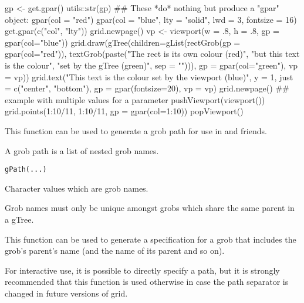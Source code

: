 \begin{Examples}
\begin{ExampleCode}
gp <- get.gpar()
utils::str(gp)
## These *do* nothing but produce a "gpar" object:
gpar(col = "red")
gpar(col = "blue", lty = "solid", lwd = 3, fontsize = 16)
get.gpar(c("col", "lty"))
grid.newpage()
vp <- viewport(w = .8, h = .8, gp = gpar(col="blue"))
grid.draw(gTree(children=gList(rectGrob(gp = gpar(col="red")),
                     textGrob(paste("The rect is its own colour (red)",
                                    "but this text is the colour",
                                    "set by the gTree (green)",
                                    sep = "\n"))),
      gp = gpar(col="green"), vp = vp))
grid.text("This text is the colour set by the viewport (blue)",
          y = 1, just = c("center", "bottom"),
          gp = gpar(fontsize=20), vp = vp)
grid.newpage()
## example with multiple values for a parameter
pushViewport(viewport())
grid.points(1:10/11, 1:10/11, gp = gpar(col=1:10))
popViewport()
\end{ExampleCode}
\end{Examples}
%
\begin{Description}\relax
This function can be used to generate a grob path for use
in  and friends.

A grob path is a list of nested grob names.
\end{Description}
%
\begin{Usage}
\begin{verbatim}
gPath(...)
\end{verbatim}
\end{Usage}
%
\begin{Arguments}
\begin{ldescription}
\item[\code{...}]  Character values which are grob names. 
\end{ldescription}
\end{Arguments}
%
\begin{Details}\relax
Grob names must only be unique amongst grobs which
share the same parent in a gTree.

This function can be used to generate a specification for
a grob that includes the grob's parent's name
(and the name of its parent and so on).

For interactive use, it is possible to directly specify
a path, but it is strongly recommended that this function
is used otherwise in case the path separator is changed
in future versions of grid.
\end{Details}
